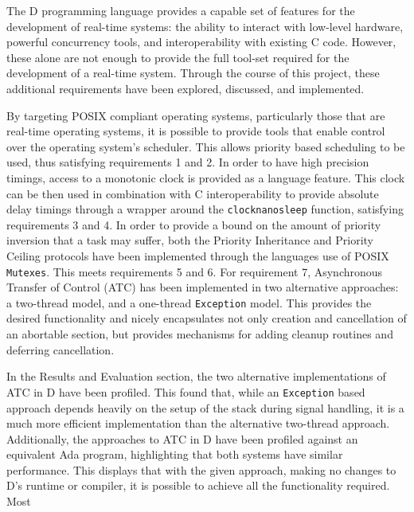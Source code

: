 

The D programming language provides a capable set of features for the 
development of real-time systems: the ability to interact with low-level 
hardware, powerful concurrency tools, and interoperability with existing C code. 
However, these alone are not enough to provide the full tool-set required for
the development of a real-time system. 
Through the course of this project, these additional requirements have been 
explored, discussed, and implemented.
\par\bigskip\noindent
By targeting POSIX compliant operating systems, particularly those that are
real-time operating systems, it is possible to provide tools that enable control 
over the operating system's scheduler. 
This allows priority based scheduling to be used, thus satisfying requirements
1 and 2.
In order to have high precision timings, access to a monotonic clock is provided 
as a language feature. 
This clock can be then used in combination with C
interoperability to provide absolute delay timings through a wrapper around the
\texttt{clock\textunderscore{}nanosleep} function, satisfying requirements 3 and
4. 
In order to provide a bound on the amount of priority inversion that a task
may suffer, both the Priority Inheritance and Priority Ceiling protocols have
been implemented through the languages use of POSIX \texttt{Mutexes}. This meets
requirements 5 and 6. 
For requirement 7, Asynchronous Transfer of Control (ATC) has been implemented in two 
alternative approaches: a two-thread model, and a one-thread \texttt{Exception} model. 
This provides the desired functionality and 
nicely encapsulates not only creation and cancellation of an
abortable section, but provides mechanisms for adding cleanup routines and deferring 
cancellation. 
\par\bigskip\noindent
In the Results and Evaluation section, the two alternative implementations of
ATC in D have been profiled. 
This found that, while an \texttt{Exception} based approach depends 
heavily on the setup of the stack during signal handling, it is a much more efficient
implementation than the alternative two-thread approach. 
Additionally, the approaches to ATC in D have been profiled against an
equivalent Ada program, highlighting that both systems have similar performance.
This displays that with the given approach, making no changes to D's runtime or
compiler, it is possible to achieve all the functionality required. Most
